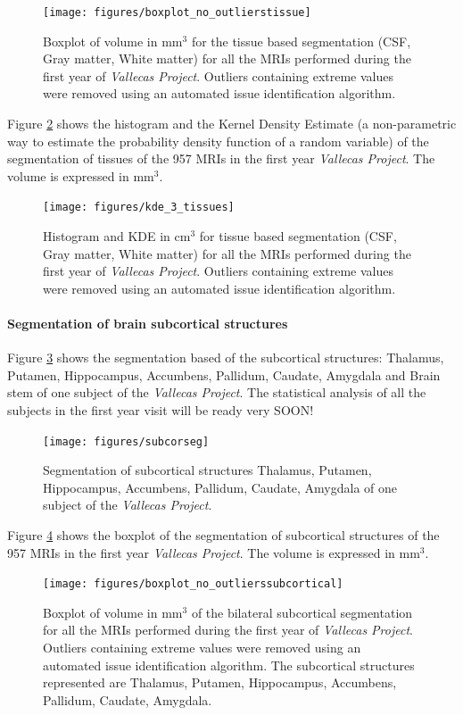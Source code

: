 \documentclass[11pt]{article}
\theoremstyle{definition}
\theoremstyle{remark}
\begin{document}
\begin{figure}[H]
        \centering
        \texttt{[image: figures/boxplot\_no\_outlierstissue]}
        \caption{Boxplot of volume in mm${^3}$ for the tissue based segmentation (CSF, Gray matter, White matter) for all the MRIs performed during the first year of \emph{Vallecas Project}. Outliers containing extreme values were removed using an automated issue identification algorithm.} 
        \label{fig:boxtissue}
\end{figure}

Figure \ref{fig:kde_3_tissues} shows the histogram and the Kernel Density Estimate (a non-parametric way to estimate the probability density function of a random variable) of the segmentation of tissues of the 957 MRIs in the first year \emph{Vallecas Project}. The volume is expressed in mm${^3}$.
\begin{figure}[H]
        \centering
        \texttt{[image: figures/kde\_3\_tissues]}
        \caption{Histogram and KDE in cm${^3}$ for tissue based segmentation (CSF, Gray matter, White matter) for all the MRIs performed during the first year of \emph{Vallecas Project}. Outliers containing extreme values were removed using an automated issue identification algorithm.} 
        \label{fig:kde_3_tissues}
\end{figure}


\paragraph*{Segmentation of brain subcortical structures}

Figure \ref{fig:subcorseg} shows the segmentation based of the subcortical structures: Thalamus, Putamen, Hippocampus, Accumbens, Pallidum, Caudate, Amygdala and Brain stem of one subject of the \emph{Vallecas Project}. The statistical analysis of all the subjects in the first year visit  will be ready very SOON! 

\begin{figure}[H]
        \centering
        \texttt{[image: figures/subcorseg]}
        \caption{Segmentation of subcortical structures Thalamus, Putamen, Hippocampus, Accumbens, Pallidum, Caudate, Amygdala of one subject of the \emph{Vallecas Project}. } 
        \label{fig:subcorseg}
\end{figure}

Figure \ref{fig:boxsubcor} shows the boxplot of the segmentation of subcortical structures of the 957 MRIs in the first year \emph{Vallecas Project}. The volume is expressed in mm${^3}$.
\begin{figure}[H]
        \centering
        \texttt{[image: figures/boxplot\_no\_outlierssubcortical]}
        \caption{Boxplot of volume in mm${^3}$ of the bilateral subcortical segmentation for all the MRIs performed during the first year of \emph{Vallecas Project}. Outliers containing extreme values were removed using an automated issue identification algorithm. The subcortical structures represented are Thalamus, Putamen, Hippocampus, Accumbens, Pallidum, Caudate, Amygdala.} 
        \label{fig:boxsubcor}
\end{figure}
\end{document}
